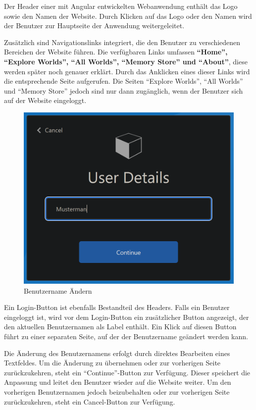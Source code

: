 Der Header einer mit Angular entwickelten Webanwendung enthält das Logo sowie den Namen der Website. Durch Klicken auf das Logo oder den Namen wird der Benutzer zur Hauptseite der Anwendung weitergeleitet.

Zusätzlich sind Navigationslinks integriert, die den Benutzer zu verschiedenen Bereichen der Website führen. Die verfügbaren Links umfassen \textbf{``Home'', ``Explore Worlds'', ``All Worlds'', ``Memory Store'' und ``About''}, diese werden später noch genauer erklärt. Durch das Anklicken eines dieser Links wird die entsprechende Seite aufgerufen. Die Seiten ``Explore Worlds'', ``All Worlds'' und ``Memory Store'' jedoch sind nur dann zugänglich, wenn der Benutzer sich auf der Website eingeloggt.


\begin{figure} [h t]
    \centering
    \includegraphics[scale=0.4]{pics/benutzername_aendern.PNG}
    \caption{Benutzername Ändern}
    \label{fig:benutzername-aendern}
\end{figure}

Ein Login-Button ist ebenfalls Bestandteil des Headers. Falls ein Benutzer eingeloggt ist, wird vor dem Login-Button ein zusätzlicher Button angezeigt, der den aktuellen Benutzernamen als Label enthält. Ein Klick auf diesen Button führt zu einer separaten Seite, auf der der Benutzername geändert werden kann.

Die Änderung des Benutzernamens erfolgt durch direktes Bearbeiten eines Textfeldes. Um die Änderung zu übernehmen oder zur vorherigen Seite zurückzukehren, steht ein ``Continue''-Button zur Verfügung. Dieser speichert die Anpassung und leitet den Benutzer wieder auf die Website weiter. Um den vorherigen Benutzernamen jedoch beizubehalten oder zur vorherigen Seite zurückzukehren, steht ein Cancel-Button zur Verfügung. 


